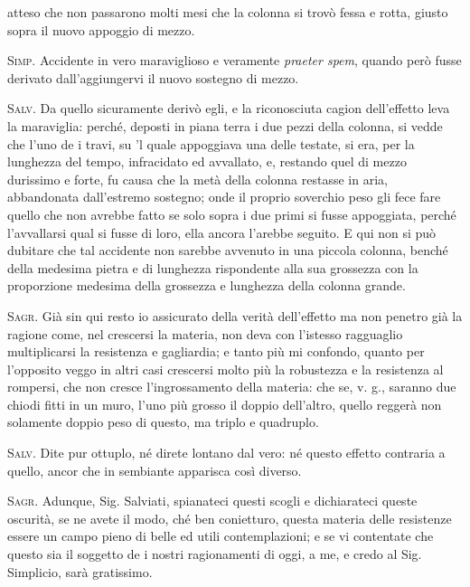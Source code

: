 \documentclass[11pt,twoside,openany]{book}
\newcommand{\speaker}[1]{\textcolor{rubric}{\textsc{#1}}\space}
\begin{document}
atteso che non passarono molti mesi che la colonna si trovò fessa e rotta, giusto sopra il nuovo appoggio di mezzo.

\speaker{Simp.} Accidente in vero maraviglioso e veramente \emph{praeter spem}, quando però fusse derivato dall'aggiungervi il nuovo sostegno di mezzo.

\speaker{Salv.} Da quello sicuramente derivò egli, e la riconosciuta cagion dell'effetto leva la maraviglia: perché, deposti in piana terra i due pezzi della colonna, si vedde che l'uno de i travi, su 'l quale appoggiava una delle testate, si era, per la lunghezza del tempo, infracidato ed avvallato, e, restando quel di mezzo durissimo e forte, fu causa che la metà della colonna restasse in aria, abbandonata dall'estremo sostegno; onde il proprio soverchio peso gli fece fare quello che non avrebbe fatto se solo sopra i due primi si fusse appoggiata, perché l'avvallarsi qual si fusse di loro, ella ancora l'arebbe seguito. E qui non si può dubitare che tal accidente non sarebbe avvenuto in una piccola colonna, benché della medesima pietra e di lunghezza rispondente alla sua grossezza con la proporzione medesima della grossezza e lunghezza della colonna grande.

\speaker{Sagr.} Già sin qui resto io assicurato della verità dell'effetto ma non penetro già la ragione come, nel crescersi la materia, non deva con l'istesso ragguaglio multiplicarsi la resistenza e gagliardia; e tanto più mi confondo, quanto per l'opposito veggo in altri casi crescersi molto più la robustezza e la resistenza al rompersi, che non cresce l'ingrossamento della materia: che se, v. g., saranno due chiodi fitti in un muro, l'uno più grosso il doppio dell'altro, quello reggerà non solamente doppio peso di questo, ma triplo e quadruplo.

\speaker{Salv.} Dite pur ottuplo, né direte lontano dal vero: né questo effetto contraria a quello, ancor che in sembiante apparisca così diverso.

\speaker{Sagr.} Adunque, Sig. Salviati, spianateci questi scogli e dichiarateci queste oscurità, se ne avete il modo, ché ben conietturo, questa materia delle resistenze essere un campo pieno di belle ed utili contemplazioni; e se vi contentate che questo sia il soggetto de i nostri ragionamenti di oggi, a me, e credo al Sig. Simplicio, sarà gratissimo.
\end{document}
